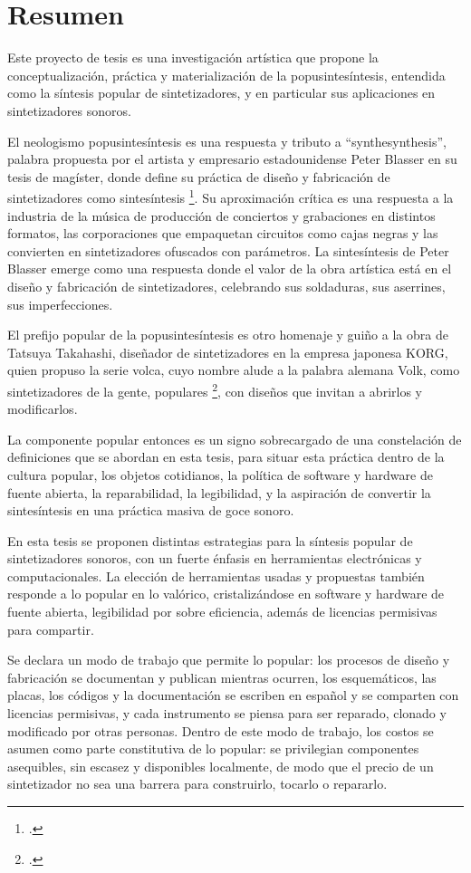 \documentclass[../candidatura.tex]{subfiles}
\begin{document}
\section{Resumen}

Este proyecto de tesis es una investigación artística que propone la conceptualización, práctica y materialización de la popusintesíntesis, entendida como la síntesis popular de sintetizadores, y en particular sus aplicaciones en sintetizadores sonoros.

El neologismo popusintesíntesis es una respuesta y tributo a ``synthesynthesis'', palabra propuesta por el artista y empresario estadounidense Peter Blasser en su tesis de magíster, donde define su práctica de diseño y fabricación de sintetizadores como sintesíntesis \footcite{blasser_stores_2005}. Su aproximación crítica es una respuesta a la industria de la música de producción de conciertos y grabaciones en distintos formatos, las corporaciones que empaquetan circuitos como cajas negras y las convierten en sintetizadores ofuscados con parámetros. La sintesíntesis de Peter Blasser emerge como una respuesta donde el valor de la obra artística está en el diseño y fabricación de sintetizadores, celebrando sus soldaduras, sus aserrines, sus imperfecciones.

El prefijo popular de la popusintesíntesis es otro homenaje y guiño a la obra de Tatsuya Takahashi, diseñador de sintetizadores en la empresa japonesa KORG, quien propuso la serie volca, cuyo nombre alude a la palabra alemana Volk, como sintetizadores de la gente, populares \footcite{synthtopia_takahashi_2017}, con diseños que invitan a abrirlos y modificarlos.

La componente popular entonces es un signo sobrecargado de una constelación de definiciones que se abordan en esta tesis, para situar esta práctica dentro de la cultura popular, los objetos cotidianos, la política de software y hardware de fuente abierta, la reparabilidad, la legibilidad, y la aspiración de convertir la sintesíntesis en una práctica masiva de goce sonoro.

En esta tesis se proponen distintas estrategias para la síntesis popular de sintetizadores sonoros, con un fuerte énfasis en herramientas electrónicas y computacionales. La elección de herramientas usadas y propuestas también responde a lo popular en lo valórico, cristalizándose en software y hardware de fuente abierta, legibilidad por sobre eficiencia, además de licencias permisivas para compartir.

Se declara un modo de trabajo que permite lo popular: los procesos de diseño y fabricación se documentan y publican mientras ocurren, los esquemáticos, las placas, los códigos y la documentación se escriben en español y se comparten con licencias permisivas, y cada instrumento se piensa para ser reparado, clonado y modificado por otras personas. Dentro de este modo de trabajo, los costos se asumen como parte constitutiva de lo popular: se privilegian componentes asequibles, sin escasez y disponibles localmente, de modo que el precio de un sintetizador no sea una barrera para construirlo, tocarlo o repararlo.
\end{document}
